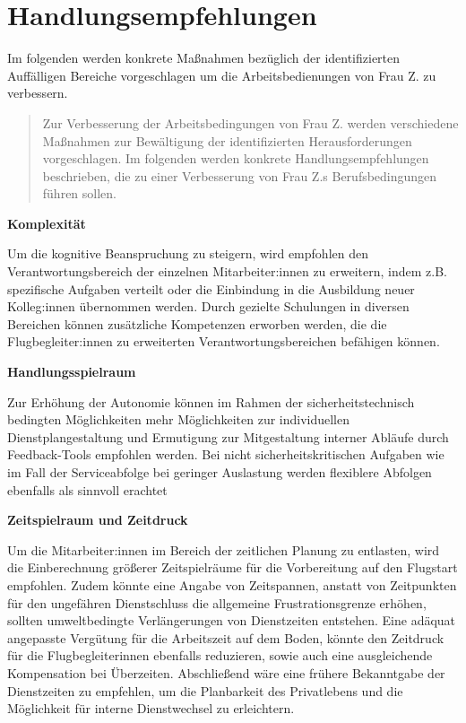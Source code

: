 \documentclass[12pt, a4paper]{article}
\begin{document}
\section{Handlungsempfehlungen}
 
Im folgenden werden konkrete Maßnahmen bezüglich der identifizierten Auffälligen Bereiche vorgeschlagen um die Arbeitsbedienungen von Frau Z. 
zu verbessern.   

\blockquote{
\tiny
Zur Verbesserung der Arbeitsbedingungen von Frau Z. werden verschiedene Maßnahmen zur Bewältigung der identifizierten Herausforderungen vorgeschlagen. 
Im folgenden werden konkrete Handlungsempfehlungen beschrieben, die zu einer Verbesserung von Frau Z.s Berufsbedingungen führen sollen.  }

\textbf{Komplexität}

Um die kognitive Beanspruchung zu steigern, wird empfohlen den Verantwortungsbereich der einzelnen 
Mitarbeiter:innen zu erweitern, indem z.B. spezifische Aufgaben verteilt oder die Einbindung in die Ausbildung 
neuer Kolleg:innen übernommen werden. Durch gezielte Schulungen in diversen Bereichen können zusätzliche 
Kompetenzen erworben werden, die die Flugbegleiter:innen zu erweiterten Verantwortungsbereichen befähigen können.

\textbf{Handlungsspielraum}

Zur Erhöhung der Autonomie können im Rahmen der sicherheitstechnisch bedingten Möglichkeiten 
mehr Möglichkeiten zur individuellen Dienstplangestaltung und Ermutigung zur Mitgestaltung 
interner Abläufe durch Feedback-Tools empfohlen werden. Bei nicht sicherheitskritischen 
Aufgaben wie im Fall der Serviceabfolge bei geringer Auslastung werden flexiblere Abfolgen ebenfalls als sinnvoll erachtet

\textbf{Zeitspielraum und Zeitdruck}

Um die Mitarbeiter:innen im Bereich der zeitlichen Planung zu entlasten, 
wird die Einberechnung größerer Zeitspielräume für die Vorbereitung auf den Flugstart empfohlen. 
Zudem könnte eine Angabe von Zeitspannen, anstatt von Zeitpunkten für den ungefähren Dienstschluss 
die allgemeine Frustrationsgrenze erhöhen, sollten umweltbedingte Verlängerungen von Dienstzeiten entstehen. 
Eine adäquat angepasste Vergütung für die Arbeitszeit auf dem Boden, 
könnte den Zeitdruck für die Flugbegleiterinnen ebenfalls reduzieren, 
sowie auch eine ausgleichende Kompensation bei Überzeiten. 
Abschließend wäre eine frühere Bekanntgabe der Dienstzeiten zu empfehlen, um die Planbarkeit des Privatlebens 
und die Möglichkeit für interne Dienstwechsel zu erleichtern. 
\end{document}
